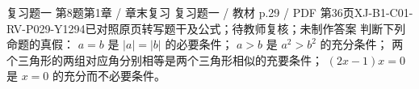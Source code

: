 \par\noindent\begin{minipage}{\linewidth}
\begin{bankitem}{复习题一 第8题}{第1章 / 章末复习 复习题一 / 教材 p.29 / PDF 第36页}{XJ-B1-C01-RV-P029-Y1294}{已对照原页转写题干及公式；待教师复核；未制作答案}
判断下列命题的真假：
$a=b$ 是 $|a|=|b|$ 的必要条件；
$a>b$ 是 $a^2>b^2$ 的充分条件；
两个三角形的两组对应角分别相等是两个三角形相似的充要条件；
$(2x-1)x=0$ 是 $x=0$ 的充分而不必要条件。
\end{bankitem}
\end{minipage}\par\medskip
